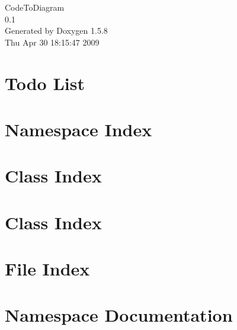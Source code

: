 \documentclass[a4paper]{book}
\begin{document}
\begin{titlepage}
\vspace*{7cm}
\begin{center}
{\Large CodeToDiagram \\[1ex]\large 0.1 }\\
\vspace*{1cm}
{\large Generated by Doxygen 1.5.8}\\
\vspace*{0.5cm}
{\small Thu Apr 30 18:15:47 2009}\\
\end{center}
\end{titlepage}
\clearemptydoublepage
{}
\tableofcontents
\clearemptydoublepage
{}
\chapter{Todo List}
\label{todo}
\hypertarget{todo}{}

\chapter{Namespace Index}

\chapter{Class Index}

\chapter{Class Index}

\chapter{File Index}

\chapter{Namespace Documentation}









\end{document}
